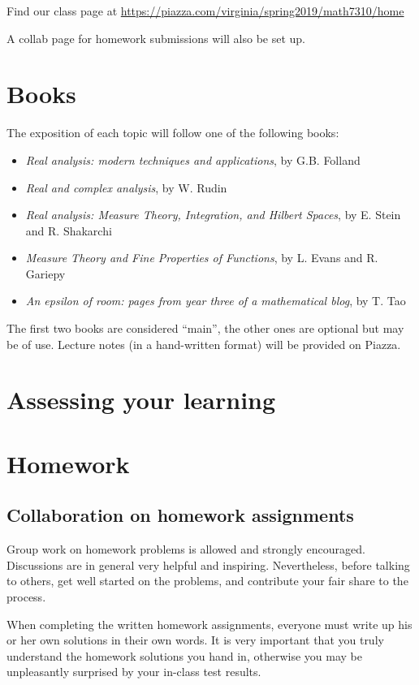 \documentclass[oneside,11pt]{amsart}
\begin{document}
Find our class page at \url{https://piazza.com/virginia/spring2019/math7310/home}

A collab page for homework submissions will also be set up.

\section{Books}

The exposition of each topic will follow one
of the following books:
\begin{itemize}
	\item \emph{Real analysis: modern techniques and applications}, by G.B. Folland
	\item \emph{Real and complex analysis}, by W. Rudin
	\item \emph{Real analysis: Measure Theory, Integration, and Hilbert Spaces},
		by E. Stein and R. Shakarchi
	\item \emph{Measure Theory and Fine Properties of Functions},
		by L. Evans and R. Gariepy
	\item \emph{An epsilon of room: pages from year three of a mathematical blog},
		by T. Tao
\end{itemize}
The first two books are considered ``main'', 
the other ones are optional but may be of use.
Lecture notes (in a hand-written format)
will be provided on Piazza. 

\section{Assessing your learning}

\section{Homework}


\subsection{Collaboration on homework assignments}
\label{collaboration}

Group work on homework problems is allowed and strongly encouraged.
Discussions are in general very
helpful and inspiring. Nevertheless, before talking to others, get well started
on the problems, and contribute your fair share to the process. 

When completing the written homework assignments, everyone must write up his or her own
solutions in their own words.
It is very important that you truly understand the homework solutions you hand
in, otherwise you may be unpleasantly surprised by your in-class test results.
\end{document}
